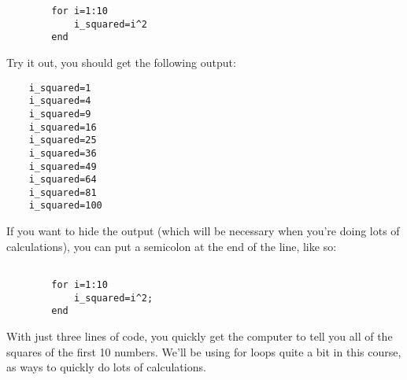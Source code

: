 \documentclass{ximera}
\begin{document}
\begin{exploration}
\begin{hint}
\begin{verbatim}
        for i=1:10
            i_squared=i^2
        end

  \end{verbatim}

  Try it out, you should get the following output:

  \begin{verbatim}
    i_squared=1
    i_squared=4
    i_squared=9
    i_squared=16
    i_squared=25
    i_squared=36
    i_squared=49
    i_squared=64
    i_squared=81
    i_squared=100
  \end{verbatim}

  If you want to hide the output (which will be necessary when you're doing lots of calculations), you can put a semicolon at the end of the line, like so:

  \begin{verbatim}

        for i=1:10
            i_squared=i^2;
        end
  \end{verbatim}

  With just three lines of code, you quickly get the computer to tell you all of the squares of the first 10 numbers. We'll be using for loops quite a bit in this course, as ways to quickly do lots of calculations. 
  \end{hint}
\end{exploration}
\end{document}
